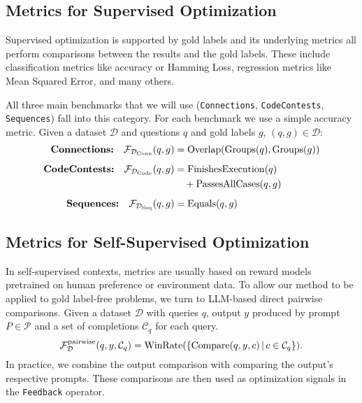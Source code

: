 \subsection{Metrics for Supervised Optimization}
Supervised optimization is supported by gold labels and its underlying metrics all perform comparisons between the results and the gold labels.
These include classification metrics like accuracy or Hamming Loss, regression metrics like Mean Squared Error, and many others.

All three main benchmarks that we will use (\texttt{Connections}, \texttt{CodeContests}, \texttt{Sequences}) 
fall into this category. For each benchmark we use a simple accuracy metric. Given a dataset $\mathcal{D}$ and questions $q$ and gold labels $g$, $(q,g) \in \mathcal{D}$:
\begin{align}
\textbf{Connections:} \quad
\mathcal{F}_{\mathcal{D}_{\text{Conn}}}(q, g) 
&= \operatorname{Overlap}(\operatorname{Groups}(q), \operatorname{Groups}(g)) \label{eq:connections} \\[0.5em]
\textbf{CodeContests:} \quad
\mathcal{F}_{\mathcal{D}_{\text{Code}}}(q, g) 
&= \operatorname{FinishesExecution}(q) \notag \\
&\quad + \operatorname{PassesAllCases}(q, g) \label{eq:codecontests} \\[0.5em]
\textbf{Sequences:} \quad
\mathcal{F}_{\mathcal{D}_{\text{Seq}}}(q, g) 
&= \operatorname{Equals}(q, g) \label{eq:sequences}
\end{align}

\subsection{Metrics for Self-Supervised Optimization}\label{sec:ssometrics}
In self-supervised contexts, metrics are usually based on reward models pretrained on human preference or environment data.
To allow our method to be applied to gold label-free problems, we turn to LLM-based direct pairwise comparisons.
Given a dataset $\mathcal{D}$ with queries $q$, output $y$ produced by prompt $P \in \mathscr{P}$ and a set of completions $\mathcal{C}_{q}$ for each query.
\begin{equation}
    \mathcal{F}_{\mathcal{D}}^{\text{pairwise}}(q, y, \mathcal{C}_{q}) = \operatorname{WinRate}(\{\operatorname{Compare}(q,y,c)\, \vert \, c\in \mathcal{C}_{q}\}).
\end{equation}
In practice, we combine the output comparison with comparing the output's respective prompts.
These comparisons are then used as optimization signals in the \texttt{Feedback} operator.

